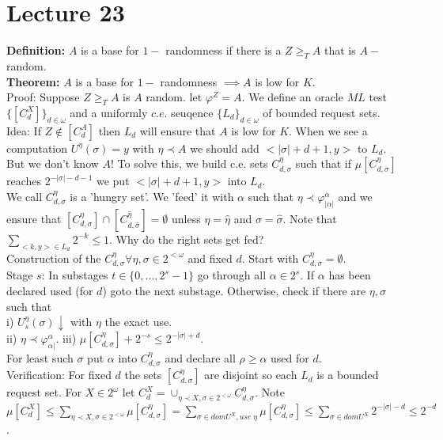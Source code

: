 \documentclass{article}
\begin{document}
      \section{Lecture 23}
      \textbf{Definition:} $A$ is a base for $1-$ randomness if there is a $Z \geq_T A$ that is $A-$ random. \\
      \textbf{Theorem:} $A$ is a base for $1-$ randomness $\implies A$ is low for $K$.
      \\ Proof: Suppose $Z \geq_TA$ is $A$ random. let $\varphi^Z= A$. We define an oracle $ML$ test $\{ [C^X_d]\}_{d\in \omega}$ and a uniformly $c.e.$ seuqence $\{L_d\}_{d\in \omega}$ of bounded request sets.\\
      Idea: If $Z \not \in [C^A_d]$ then $L_d$ will ensure that $A$ is low for $K$. When we see a computation $U^\eta(\sigma) = y$ with $\eta \prec A$ we should add $<|\sigma| + d+1,y>$ to $L_d$. But we don't know $A$! To solve this, we build c.e. sets $C^\eta_{d,\sigma}$ such that if $\mu[C^\eta_{d,\sigma}]$ reaches $2^{-|\sigma|-d-1}$ we put $<|\sigma|+d+1,y> $ into $L_d$. \\
      We call $C^\eta_{d,\sigma}$ is a 'hungry set'. We 'feed' it with $\alpha$ such that $\eta \prec \varphi^\alpha_{|\alpha|}$ and we ensure that $[C_{d,\sigma}^\eta] \cap [C_{d,\hat \sigma}^{\hat \eta}] = \emptyset$ unless $\eta = \hat \eta $ and $\sigma = \hat \sigma$. Note that $\sum_{<k,y> \in L_d} 2^{-k} \leq 1$. Why do the right sets get fed? \\
      Construction of the $C^\eta_{d,\sigma} \forall \eta,\sigma \in 2^{<\omega}$ and fixed $d$. Start with $C^\eta_{d,\sigma} = \emptyset$. \\
      Stage $s$: In substages $t \in \{0,...,2^s-1\}$ go through all $\alpha \in 2^s$. If $\alpha$ has been declared used (for $d$) goto the next substage. Otherwise, check if there are $\eta, \sigma$ such that \\
  i) $U^\eta_s(\sigma)\downarrow$ with $\eta$ the exact use.\\
  ii) $\eta \prec \varphi^\alpha_{\alpha|}$.
  iii) $\mu[C^\eta_{d,\sigma}]+2^{-s} \leq 2^{-|\sigma|+d}$.
  \\ For least such $\sigma$ put $\alpha$ into $C^\eta_{d,\sigma}$ and declare all $\rho \geq \alpha$ used for $d$.\\
  Verification: For fixed $d$ the sets $[C_{d,\sigma}^\eta]$ are disjoint so each $L_d$ is a bounded request set. For $X \in 2^\omega$ let $C_d^X = \cup_{\eta \prec X, \sigma \in 2^{<\omega} }C^\eta_{d,\sigma}$.  Note $\mu[C_d^X] \leq \sum_{\eta \prec X, \sigma \in 2^{<\omega}} \mu[C^\eta_{d,\sigma}] = \sum_{\sigma \in dom U^X, use\; \eta} \mu [C_{d,\sigma}^\eta] \leq \sum_{\sigma \in dom U^X} 2^{-|\sigma| -d} \leq 2^{-d}$.\\
\end{document}
